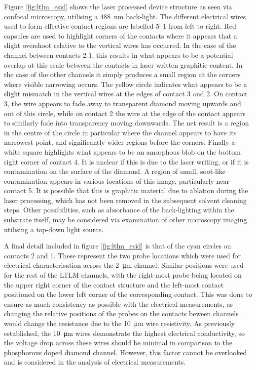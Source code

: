 \begin{refsection}
Figure \ref{fig:ltlm_esid} shows the laser processed device structure as seen via confocal microscopy, utilising a 488~\si{\nano\metre} back-light. The different electrical wires used to form effective contact regions are labelled 5--1 from left to right. Red capsules are used to highlight corners of the contacts where it appears that a slight overshoot relative to the vertical wires has occurred. In the case of the channel between contacts 2-1, this results in what appears to be a potential overlap at this scale between the contacts in laser written graphitic content. In the case of the other channels it simply produces a small region at the corners where visible narrowing occurs. The yellow circle indicates what appears to be a slight mismatch in the vertical wires at the edges of contact 3 and 2. On contact 3, the wire appears to fade away to transparent diamond moving upwards and out of this circle, while on contact 2 the wire at the edge of the contact appears to similarly fade into transparency moving downwards. The net result is a region in the centre of the circle in particular where the channel appears to have its narrowest point, and significantly wider regions before the corners. Finally a white square highlights what appears to be an amorphous blob on the bottom right corner of contact 4. It is unclear if this is due to the laser writing, or if it is contamination on the surface of the diamond. A region of small, soot-like contamination appears in various locations of this image, particularly near contact 5. It is possible that this is graphitic material due to ablation during the laser processing, which has not been removed in the subsequent solvent cleaning steps. Other possibilities, such as absorbance of the back-lighting within the substrate itself, may be considered via examination of other microscopy imaging utilising a top-down light source.

A final detail included in figure \ref{fig:ltlm_esid} is that of the cyan circles on contacts 2 and 1. These represent the two probe locations which were used for electrical characterisation across the 2~\si{\micro\metre} channel. Similar positions were used for the rest of the LTLM channels, with the right-most probe being located on the upper right corner of the contact structure and the left-most contact positioned on the lower left corner of the corresponding contact. This was done to ensure as much consistency as possible with the electrical measurements, as changing the relative positions of the probes on the contacts beween channels would change the resistance due to the 10~\si{\micro\metre} wire resistivity. As previously established, the 10~\si{\micro\metre} wires demonstrate the highest electrical conductivity, so the voltage drop across these wires should be minimal in comparison to the phosphorous doped diamond channel. However, this factor cannot be overlooked and is considered in the analysis of electrical measurements.


\end{refsection}
